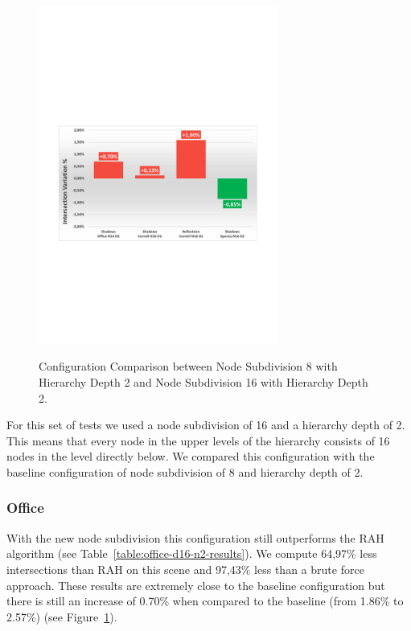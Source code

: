 \begin{figure}[!htb]
    \begin{center}
    \includegraphics[width=0.70\textwidth]{Images/Chart_Comparison_N8_D2_N16_D2}
    \label{fig:comparison-results-d8-n2-d16-n2}
    \caption{Configuration Comparison between Node Subdivision 8 with Hierarchy Depth 2 and Node Subdivision 16 with Hierarchy Depth 2.}
    \end{center}
\end{figure}

For this set of tests we used a node subdivision of 16 and a hierarchy depth of 2. This means that every node in the upper levels of the hierarchy consists of 16 nodes in the level directly below. We compared this configuration with the baseline configuration of node subdivision of 8 and hierarchy depth of 2.

\subsubsection{Office}

With the new node subdivision this configuration still outperforms the RAH algorithm (see Table~\ref{table:office-d16-n2-results}). We compute 64,97\% less intersections than RAH on this scene and 97,43\% less than a brute force approach. These results are extremely close to the baseline configuration but there is still an increase of 0.70\% when compared to the baseline (from 1.86\% to 2.57\%) (see Figure~\ref{fig:comparison-results-d8-n2-d16-n2}).

